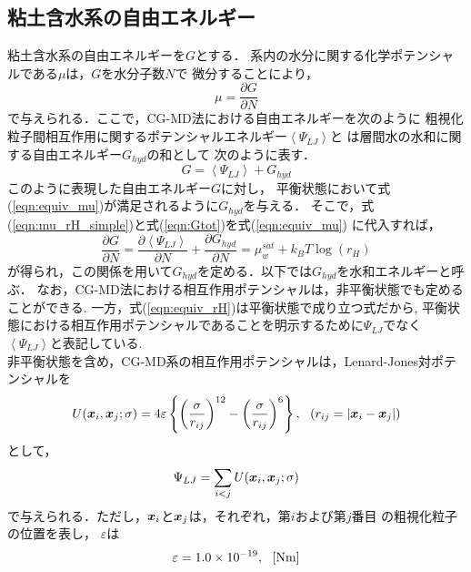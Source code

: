\subsection{粘土含水系の自由エネルギー}
粘土含水系の自由エネルギーを$G$とする．
系内の水分に関する化学ポテンシャルである$\mu$は，$G$を水分子数$N$で
微分することにより，
\begin{equation}
	\mu=\frac{\partial G}{\partial N}
	\label{eqn:mu_GN}
\end{equation}
で与えられる．ここで，CG-MD法における自由エネルギーを次のように
粗視化粒子間相互作用に関するポテンシャルエネルギー$\left<\Psi_{LJ}\right>$と
は層間水の水和に関する自由エネルギー$G_{hyd}$の和として
次のように表す．
\begin{equation}
	G=\left< \Psi_{LJ} \right> +G_{hyd}
	\label{eqn:Gtot}
\end{equation}
このように表現した自由エネルギー$G$に対し，
平衡状態において式(\ref{eqn:equiv_mu})が満足されるように$G_{hyd}$を与える．
そこで，式(\ref{eqn:mu_rH_simple})と式(\ref{eqn:Gtot})を式(\ref{eqn:equiv_mu})
に代入すれば，
\begin{equation}
	\frac{\partial G}{\partial N}
	=
	\frac{\partial \left< \Psi_{LJ}\right>}{\partial N}
	+
	\frac{\partial G_{hyd}}{\partial N}
	=
	\mu_w^{sat} +k_BT \log
	\left(
		r_H
	\right)
	\label{eqn:equiv_rH}
\end{equation}
が得られ，この関係を用いて$G_{hyd}$を定める．以下では$G_{hyd}$を水和エネルギーと呼ぶ．
なお，CG-MD法における相互作用ポテンシャルは，非平衡状態でも定めることができる.
一方，式(\ref{eqn:equiv_rH})は平衡状態で成り立つ式だから,
平衡状態における相互作用ポテンシャルであることを明示するために$\Psi_{LJ}$でなく
$\left< \Psi_{LJ}\right>$と表記している. \\
\hspace{\parindent}
非平衡状態を含め，CG-MD系の相互作用ポテンシャルは，Lenard-Jones対ポテンシャルを
\begin{equation}
	U(\mbox{\boldmath $x$}_i,\mbox{\boldmath $x$}_j; \sigma) 
	= 4 \varepsilon 
	\left\{ 
	\left(\frac{\sigma}{r_{ij}}\right)^{12}
	-
	\left(\frac{\sigma}{r_{ij}}\right)^6
	\right\}, \ \ \left( r_{ij}=\left| \mbox{\boldmath $x$}_i-\mbox{\boldmath $x$}_j\right| \right)
	\label{eqn:LJ}
\end{equation}
として，
\begin{equation}
	\Psi_{LJ}=\sum_{i<j} U(\mbox{\boldmath $x$}_i,\mbox{\boldmath $x$}_j; \sigma) 
	\label{eqn:def_PsiLJ}
\end{equation}
で与えられる．ただし，$\mbox{\boldmath $x$}_i$と$\mbox{\boldmath $x$}_j$は，それぞれ，第$i$および第$j$番目
の粗視化粒子の位置を表し，
$\varepsilon$は
\begin{equation}
	\varepsilon=1.0\times 10^{-19}, \ \ [{\rm Nm}]
	\label{eqn:eps_of_LJ}
\end{equation}
